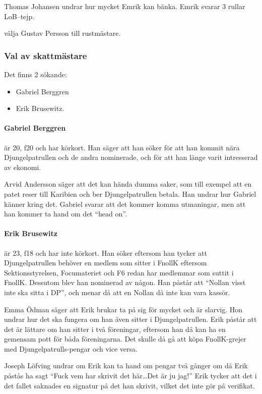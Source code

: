 \documentclass[hidelinks]{sektionsmote}
\begin{document}
Thomas Johansen undrar hur mycket Emrik kan bänka.
Emrik svarar 3 rullar LoB--tejp.

\begin{beslut}
  \item välja Gustav Persson till rustmästare.
\end{beslut}

\subsubsection{Val av skattmästare}
Det finns 2 sökande:
\begin{itemize}
    \item Gabriel Berggren
    \item Erik Brusewitz.
\end{itemize}

\paragraph{Gabriel Berggren} är 20, f20 och har körkort.
Han säger att han söker för att han kommit nära Djungelpatrullen och de andra nominerade, och för att han länge varit intresserad av ekonomi.

Arvid Andersson säger att det kan hända dumma saker, som till exempel att en patet reser till Karibien och ber Djungelpatrullen betala.
Han undrar hur Gabriel känner kring det.
Gabriel svarar att det kommer komma utmaningar, men att han kommer ta hand om det \enquote{head on}.

\paragraph{Erik Brusewitz} är 23, f18 och har inte körkort.
Han söker eftersom han tycker att Djungelpatrullen behöver en medlem som sitter i FnollK eftersom Sektionsstyrelsen, Focumateriet och F6 redan har medlemmar som suttit i FnollK.
Dessutom blev han nominerad av någon.
Han påstår att \enquote{Nollan visst inte ska sitta i DP}, och menar då att en Nollan då inte kan vara kassör.

Emma Ödman säger att Erik brukar ta på sig för mycket och är slarvig.
Hon undrar hur det ska fungera om han även sitter i Djungelpatrullen.
Erik påstår att det är lättare om han sitter i två föreningar, eftersom han då kan ha en gemensam pott för båda föreningarna.
Det skulle då gå att köpa FnollK-grejer med Djungelpatrulls-pengar och vice versa.

Joseph Löfving undrar om Erik kan ta hand om pengar två gånger om då Erik påstås ha sagt \enquote{Fuck vem har skrivit det här\dots Det är ju jag!}
Erik tycker att det i det fallet saknades en signatur på det han skrivit, vilket det inte gör på verifikat.
\end{document}
